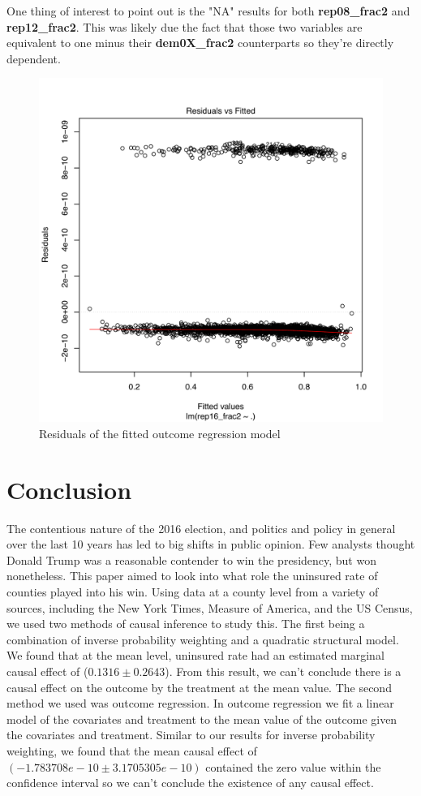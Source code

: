 \documentclass[11pt, conference,compsoc]{IEEEtran}
\begin{document}
One thing of interest to point out is the "NA" results for both \textbf{rep08\_frac2} and \textbf{rep12\_frac2}. This was likely due the fact that those two variables are equivalent to one minus their \textbf{dem0X\_frac2} counterparts so they're directly dependent.
\begin{figure} 
	\centering
	\includegraphics[width=.5\textwidth]{output_regression_Residuals}
	\caption{Residuals of the fitted outcome regression model}
    \label{outcome-regression}
\end{figure}

\section{Conclusion}
The contentious nature of the 2016 election, and politics and policy in general over the last 10 years has led to big shifts in public opinion. Few analysts thought Donald Trump was a reasonable contender to win the presidency, but won nonetheless. This paper aimed to look into what role the uninsured rate of counties played into his win. Using data at a county level from a variety of sources, including the New York Times, Measure of America, and the US Census, we used two methods of causal inference to study this. The first being a combination of inverse probability weighting and a quadratic structural model. We found that at the mean level, uninsured rate had an estimated marginal causal effect of ($0.1316 \pm 0.2643$). From this result, we can't conclude there is a causal effect on the outcome by the treatment at the mean value. The second method we used was outcome regression. In outcome regression we fit a linear model of the covariates and treatment to the mean value of the outcome given the covariates and treatment. Similar to our results for inverse probability weighting, we found that the mean causal effect of  $(-1.783708e-10\pm3.1705305e-10)$ contained the zero value within the confidence interval so we can't conclude the existence of any causal effect.
\end{document}
